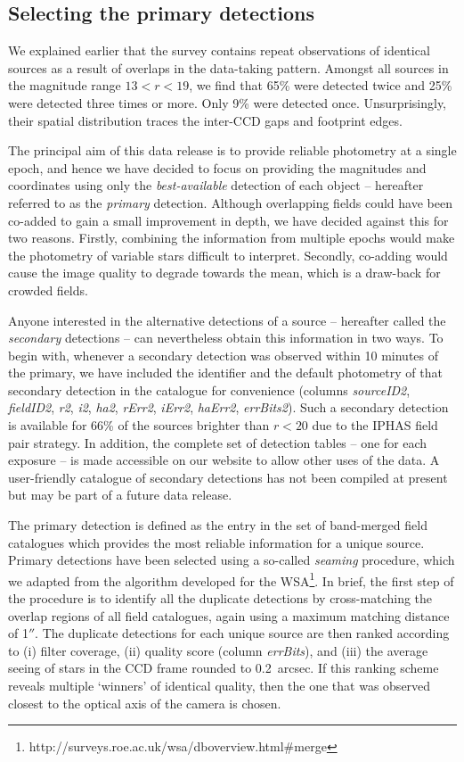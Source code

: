 \documentclass[useAMS,usenatbib]{mn2e}
\def\arcsec{$''$}
\begin{document}
\subsection{Selecting the primary detections}

We explained earlier that the survey contains repeat observations
of identical sources as a result of overlaps in the data-taking pattern.
Amongst all sources in the magnitude range $13<r<19$,
we find that 65\% were detected twice and 25\% were detected three times or more.
Only 9\% were detected once.
Unsurprisingly, their spatial distribution traces
the inter-CCD gaps and footprint edges.

The principal aim of this data release is to provide 
reliable photometry at a single epoch,
and hence we have decided
to focus on providing the magnitudes
and coordinates using only the \emph{best-available} 
detection of each object -- 
hereafter referred to as the \emph{primary} detection.
Although overlapping fields could have been co-added 
to gain a small improvement in depth, 
we have decided against this for two reasons.
Firstly, combining the information from multiple epochs
would make the photometry of variable stars difficult to interpret.
Secondly, co-adding would cause the image quality to degrade towards the mean,
which is a draw-back for crowded fields.

Anyone interested in the alternative detections of a source
-- hereafter called the \emph{secondary} detections --
can nevertheless obtain this information in two ways.
To begin with, whenever a secondary detection was observed 
within 10 minutes of the primary,
we have included the identifier and the default photometry
of that secondary detection
in the catalogue for convenience
(columns \emph{sourceID2}, \emph{fieldID2}, 
\emph{r2}, \emph{i2}, \emph{ha2},
\emph{rErr2}, \emph{iErr2}, \emph{haErr2}, \emph{errBits2}).
Such a secondary detection is available for 66\% of the sources brighter than $r<20$
due to the IPHAS field pair strategy.
In addition, the complete set of detection tables -- one for each exposure -- 
is made accessible on our website to allow other uses of the data.
A user-friendly catalogue of secondary detections 
has not been compiled at present 
but may be part of a future data release.

The primary detection is defined as the entry in the 
set of band-merged field catalogues which provides 
the most reliable information for a unique source.
Primary detections have been selected using a so-called \emph{seaming} procedure,
which we adapted from the algorithm developed for the WSA\footnote{http://surveys.roe.ac.uk/wsa/dboverview.html\#merge}.
In brief, the first step of the procedure is to identify all the duplicate detections
by cross-matching the overlap regions of all field catalogues,
again using a maximum matching distance of 1\arcsec.
The duplicate detections for each unique source are then ranked according to
(i) filter coverage, (ii) quality score (column \emph{errBits}),
and (iii) the average seeing of stars in the CCD frame rounded to 0.2~arcsec.
If this ranking scheme reveals multiple `winners' of identical quality,
then the one that was observed closest to the optical axis of the camera is chosen.
\end{document}
